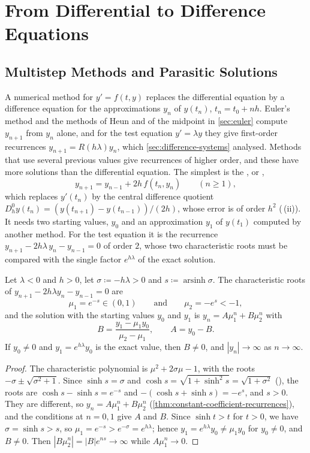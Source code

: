 \section{From Differential to Difference Equations}
\label{sec:ode-to-difference}

\subsection{Multistep Methods and Parasitic Solutions}

A numerical method for $y'=f(t,y)$ replaces the differential equation by a difference equation for the approximations $y_n$ of $y(t_n)$, $t_n=t_0+nh$. Euler's method and the methods of Heun and of the midpoint in \cref{sec:euler} compute $y_{n+1}$ from $y_n$ alone, and for the test equation $y'=\lambda y$ they give first-order recurrences $y_{n+1}=R(h\lambda)y_n$, which \cref{sec:difference-systems} analysed. Methods that use several previous values give recurrences of higher order, and these have more solutions than the differential equation. The simplest is the , or ,
\begin{equation}
y_{n+1}=y_{n-1}+2h\,f(t_n,y_n)\qquad(n\ge1),
\label{eq:leapfrog}
\end{equation}
which replaces $y'(t_n)$ by the central difference quotient $D_h^0y(t_n)=(y(t_{n+1})-y(t_{n-1}))/(2h)$, whose error is of order $h^2$ (\,(ii)). It needs two starting values, $y_0$ and an approximation $y_1$ of $y(t_1)$ computed by another method. For the test equation it is the recurrence $y_{n+1}-2h\lambda\,y_n-y_{n-1}=0$ of order $2$, whose two characteristic roots must be compared with the single factor $e^{h\lambda}$ of the exact solution.

\begin{proposition}
\label{prop:leapfrog-roots}
Let $\lambda<0$ and $h>0$, let $\sigma\coloneqq-h\lambda>0$ and $s\coloneqq\operatorname{arsinh}\sigma$. The characteristic roots of $y_{n+1}-2h\lambda y_n-y_{n-1}=0$ are
\[
\mu_1=e^{-s}\in(0,1)\qquad\text{and}\qquad\mu_2=-e^{s}<-1 ,
\]
and the solution with the starting values $y_0$ and $y_1$ is $y_n=A\mu_1^n+B\mu_2^n$ with
\[
B=\frac{y_1-\mu_1y_0}{\mu_2-\mu_1},\qquad A=y_0-B .
\]
If $y_0\ne0$ and $y_1=e^{h\lambda}y_0$ is the exact value, then $B\ne0$, and $|y_n|\to\infty$ as $n\to\infty$.
\end{proposition}

\begin{proof}
The characteristic polynomial is $\mu^2+2\sigma\mu-1$, with the roots $-\sigma\pm\sqrt{\sigma^2+1}$. Since $\sinh s=\sigma$ and $\cosh s=\sqrt{1+\sinh^2s}=\sqrt{1+\sigma^2}$ (), the roots are $\cosh s-\sinh s=e^{-s}$ and $-(\cosh s+\sinh s)=-e^s$, and $s>0$. They are different, so $y_n=A\mu_1^n+B\mu_2^n$ (\cref{thm:constant-coefficient-recurrences}), and the conditions at $n=0,1$ give $A$ and $B$. Since $\sinh t>t$ for $t>0$, we have $\sigma=\sinh s>s$, so $\mu_1=e^{-s}>e^{-\sigma}=e^{h\lambda}$; hence $y_1=e^{h\lambda}y_0\ne\mu_1y_0$ for $y_0\ne0$, and $B\ne0$. Then $|B\mu_2^n|=|B|e^{ns}\to\infty$ while $A\mu_1^n\to0$.
\end{proof}

